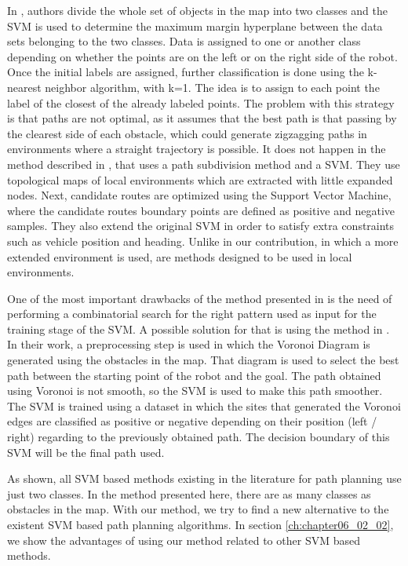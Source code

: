 In \cite{sarkar2008mobile, tennety2009support}, authors divide the whole set of objects in the map into two classes and the \ac{SVM} is used to determine the maximum margin hyperplane between the data sets belonging to the two classes. Data is assigned to one or another class depending on whether the points are on the left or on the right side of the robot. Once the initial labels are assigned, further classification is done using the k-nearest neighbor algorithm, with k=1. The idea is to assign to each point the label of the closest of the already labeled points. The problem with this strategy is that paths are not optimal, as it assumes that the best path is that passing by the clearest side of each obstacle, which could generate zigzagging paths in environments where a straight trajectory is possible. It does not happen in the method described in \cite{qingyang2012local}, that uses a path subdivision method and a \ac{SVM}. They use topological maps of local environments which are extracted with little expanded nodes. Next, candidate routes are optimized using the Support Vector Machine, where the candidate routes boundary points are defined as positive and negative samples. They also extend the original \ac{SVM} \citep{cortes1995support} in order to satisfy extra constraints such as vehicle position and heading. Unlike in our contribution, in which a more extended environment is used, \cite{sarkar2008mobile, tennety2009support, qingyang2012local} are methods designed to be used in local environments.

One of the most important drawbacks of the method presented in \cite{miura2006support} is the need of performing a combinatorial search for the right pattern used as input for the training stage of the \ac{SVM}. A possible solution for that is using the method in \cite{yang2012safe}. In their work, a preprocessing step is used in which the Voronoi Diagram is generated using the obstacles in the map. That diagram is used to select the best path between the starting point of the robot and the goal. The path obtained using Voronoi is not smooth, so the \ac{SVM} is used to make this path smoother. The \ac{SVM} is trained using a dataset in which the sites that generated the Voronoi edges are classified as positive or negative depending on their position (left / right) regarding to the previously obtained path. The decision boundary of this \ac{SVM} will be the final path used.

As shown, all \ac{SVM} based methods existing in the literature for path planning use just two classes. In the method presented here, there are as many classes as obstacles in the map. With our method, we try to find a new alternative to the existent \ac{SVM} based path planning algorithms. In section \ref{ch:chapter06_02_02}, we show the advantages of using our method related to other \ac{SVM} based methods.

